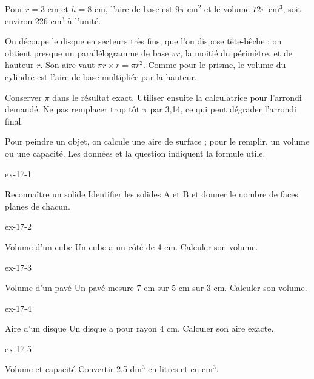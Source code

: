 \begin{exemple}Pour $r=3$ cm et $h=8$ cm, l’aire de base est $9\pi$ cm$^2$ et le volume $72\pi$ cm$^3$, soit environ 226 cm$^3$ à l’unité.\end{exemple}
\begin{savoirfaire}On découpe le disque en secteurs très fins, que l’on dispose tête-bêche : on obtient presque un parallélogramme de base $\pi r$, la moitié du périmètre, et de hauteur $r$. Son aire vaut $\pi r\times r=\pi r^2$. Comme pour le prisme, le volume du cylindre est l’aire de base multipliée par la hauteur.\end{savoirfaire}
\begin{savoirfaire}Conserver $\pi$ dans le résultat exact. Utiliser ensuite la calculatrice pour l’arrondi demandé. Ne pas remplacer trop tôt $\pi$ par 3,14, ce qui peut dégrader l’arrondi final.\end{savoirfaire}
\begin{attention}Pour peindre un objet, on calcule une aire de surface ; pour le remplir, un volume ou une capacité. Les données et la question indiquent la formule utile.\end{attention}

\clearpage{}
\begin{blocLivre}{ex-17-1}\begin{exercice}[1]{Reconnaître un solide}
Identifier les solides A et B et donner le nombre de faces planes de chacun.
\label{fig-ex-17-1}
\end{exercice}\end{blocLivre}
\begin{blocLivre}{ex-17-2}\begin{exercice}[1]{Volume d’un cube}
Un cube a un côté de 4 cm. Calculer son volume.
\label{fig-ex-17-2}
\end{exercice}\end{blocLivre}
\begin{blocLivre}{ex-17-3}\begin{exercice}[1]{Volume d’un pavé}
Un pavé mesure 7 cm sur 5 cm sur 3 cm. Calculer son volume.
\label{fig-ex-17-3}
\end{exercice}\end{blocLivre}
\begin{blocLivre}{ex-17-4}\begin{exercice}[1]{Aire d’un disque}
Un disque a pour rayon 4 cm. Calculer son aire exacte.
\label{fig-ex-17-4}
\end{exercice}\end{blocLivre}
\begin{blocLivre}{ex-17-5}\begin{exercice}[1]{Volume et capacité}
Convertir 2,5 dm$^3$ en litres et en cm$^3$.
\label{fig-ex-17-5}
\end{exercice}\end{blocLivre}

